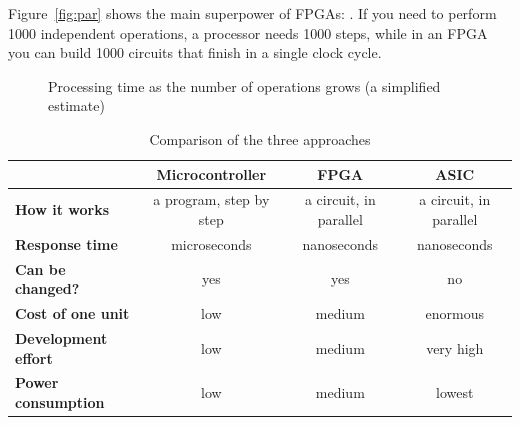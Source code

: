 Figure~\ref{fig:par} shows the main superpower of FPGAs: .
If you need to perform 1000 independent operations, a processor needs
1000 steps, while in an FPGA you can build 1000 circuits that finish in a single
clock cycle.

\begin{figure}[H]
\centering
{}
\caption{Processing time as the number of operations grows (a simplified estimate)}
\end{figure}

\begin{table}[H]
\centering
\caption{Comparison of the three approaches}
\small
\begin{tabularx}{\textwidth}{>{\bfseries}X c c c}
\toprule
 & \textbf{Microcontroller} & \textbf{FPGA} & \textbf{ASIC} \\
\midrule
How it works          & a program, step by step & a circuit, in parallel & a circuit, in parallel \\
Response time         & microseconds        & nanoseconds        & nanoseconds \\
Can be changed?       & yes                 & yes                & no \\
Cost of one unit      & low                 & medium             & enormous \\
Development effort    & low                 & medium             & very high \\
Power consumption     & low                 & medium             & lowest \\
\bottomrule
\end{tabularx}
\end{table}

